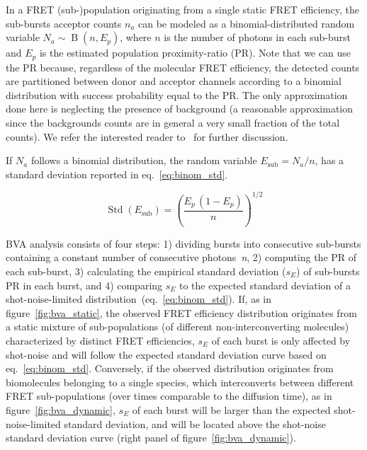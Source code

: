 \documentclass[10pt,letterpaper]{article}
\begin{document}
In a FRET (sub-)population originating from a single static FRET efficiency,
the sub-bursts acceptor counts $n_a$ can be modeled as a binomial-distributed random variable
$N_a \sim \operatorname{B}(n, E_p)$, where $n$ is the number of photons in each sub-burst and
$E_p$ is the estimated population proximity-ratio (PR).
Note that we can use the PR because, regardless of the molecular FRET efficiency,
the detected counts are partitioned between donor and acceptor channels according to
a binomial distribution with success probability equal to the PR.
The only approximation done here is neglecting the presence of background
(a reasonable approximation since the backgrounds counts are in general a
very small fraction of the total counts).
We refer the interested reader to~\cite{Torella_2011} for further discussion.

If $N_a$ follows a binomial distribution, the random variable $E_{\textrm{sub}} = N_a/n$,
has a standard deviation reported in eq.~\ref{eq:binom_std}.

\begin{equation}
\label{eq:binom_std}
\operatorname{Std}(E_{\textrm{sub}}) = \left( \frac{E_p\,(1 - E_p)}{n} \right)^{1/2}
\end{equation}

BVA analysis consists of four steps: 1) dividing bursts into consecutive sub-bursts 
containing a constant number of consecutive photons~\textit{n}, 2) computing the PR
of each sub-burst, 3) calculating the empirical standard deviation ($s_E$) of sub-bursts
PR in each burst, and 4) comparing $s_E$ to the expected standard deviation
of a shot-noise-limited distribution~(eq.~\ref{eq:binom_std}).
If, as in figure~\ref{fig:bva_static}, the observed FRET efficiency distribution
originates from a static mixture of sub-populations (of different
non-interconverting molecules) characterized by distinct FRET efficiencies,
$s_E$ of each burst is only affected by shot-noise and will follow the expected
standard deviation curve based on eq.~\ref{eq:binom_std}.
Conversely, if the observed distribution originates from biomolecules belonging to a single species, 
which interconverts between different FRET sub-populations (over times comparable to the diffusion
time), as in figure~\ref{fig:bva_dynamic}, $s_E$ of each burst will be larger than the expected
shot-noise-limited standard deviation, and will be located above the shot-noise standard
deviation curve (right panel of figure~\ref{fig:bva_dynamic}).
\end{document}
